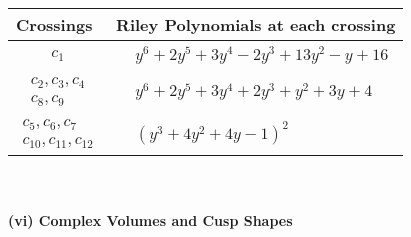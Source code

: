 \documentclass[1p]{elsarticle_modified}
\theoremstyle{definition}
\begin{document}
\begin{tabular}{m{50pt}|m{274pt}}
Crossings & \hspace{64pt}Riley Polynomials at each crossing \\
\hline $$\begin{aligned}c_{1}\end{aligned}$$&$\begin{aligned}
&y^6+2 y^5+3 y^4-2 y^3+13 y^2- y+16
\end{aligned}$\\
\hline $$\begin{aligned}c_{2},c_{3},c_{4}\\c_{8},c_{9}\end{aligned}$$&$\begin{aligned}
&y^6+2 y^5+3 y^4+2 y^3+y^2+3 y+4
\end{aligned}$\\
\hline $$\begin{aligned}c_{5},c_{6},c_{7}\\c_{10},c_{11},c_{12}\end{aligned}$$&$\begin{aligned}
&(y^3+4 y^2+4 y-1)^2
\end{aligned}$\\
\hline
\end{tabular}\\~\\
\newpage\flushleft \textbf{(vi) Complex Volumes and Cusp Shapes}
\end{document}
